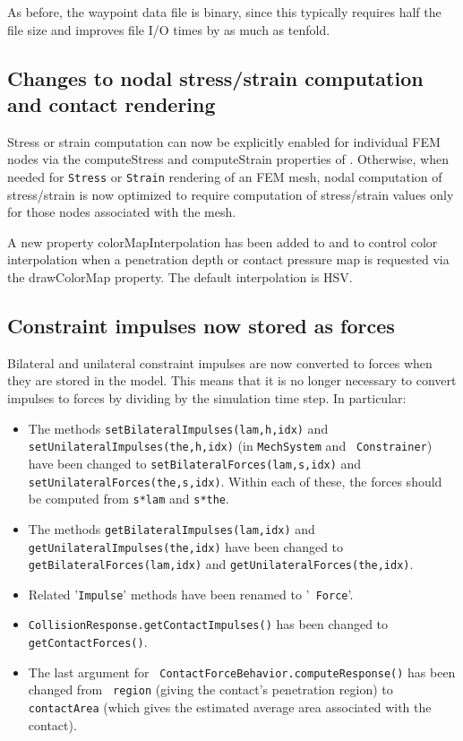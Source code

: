 \documentclass{article}
\begin{document}
As before, the waypoint data file is binary, since this typically
requires half the file size and improves file I/O times by as much as
tenfold.

\subsection*{Changes to nodal stress/strain computation and 
contact rendering}

Stress or strain computation can now be explicitly enabled for
individual FEM nodes via the {\sf computeStress} and {\sf
computeStrain} properties of
.  Otherwise, when
needed for {\tt Stress} or {\tt Strain} rendering of an FEM mesh,
nodal computation of stress/strain is now optimized to require
computation of stress/strain values only for those nodes associated
with the mesh.

A new property {\sf colorMapInterpolation} has been added to
 and
to control color interpolation when a penetration depth or
contact pressure map is requested via the {\sf drawColorMap} property.
The default interpolation is HSV.

\subsection*{Constraint impulses now stored as forces}

Bilateral and unilateral constraint impulses are now converted to
forces when they are stored in the model. This means that it is no
longer necessary to convert impulses to forces by dividing by the
simulation time step. In particular:

\begin{itemize}

\item The methods {\tt setBilateralImpulses(lam,h,idx)} and {\tt
setUnilateralImpulses(the,h,idx)} (in {\tt MechSystem} and {\tt
Constrainer}) have been changed to {\tt setBilateralForces(lam,s,idx)}
and {\tt setUnilateralForces(the,s,idx)}. Within each of these, the
forces should be computed from {\tt s*lam} and {\tt s*the}.

\item The methods {\tt getBilateralImpulses(lam,idx)} and {\tt
getUnilateralImpulses(the,idx)} have been changed to {\tt
getBilateralForces(lam,idx)} and {\tt getUnilateralForces(the,idx)}.

\item Related '{\tt Impulse}' methods have been renamed to '{\tt
Force}'.

\item {\tt CollisionResponse.getContactImpulses()} has been changed to
{\tt getContactForces()}.

\item The last argument for {\tt
ContactForceBehavior.computeResponse()} has been changed from {\tt
region} (giving the contact's penetration region) to {\tt contactArea}
(which gives the estimated average area associated with the contact).

\end{itemize}
\end{document}
